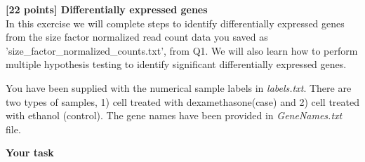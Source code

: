 {\bf [22 points] Differentially expressed genes}\\

In this exercise we will complete steps to identify differentially expressed genes from the size factor normalized read count data you saved as 'size\_factor\_normalized\_counts.txt', from Q1. We will also learn how to perform multiple hypothesis testing to identify significant differentially expressed genes.

You have been supplied with the numerical sample labels in \textit{labels.txt}. There are two types of samples, 1) cell treated with dexamethasone(case) and 2) cell treated with ethanol (control). The gene names have been provided in \textit{GeneNames.txt} file.

\vspace{20pt}


\vspace{20pt}

\textbf{Your task}

\vspace{20pt}

